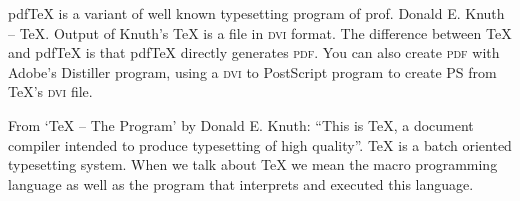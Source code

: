 \documentclass{article}
\begin{document}
\maketitle
\begin{abstract}\noindent\sffamily\itshape
    This document is a preliminary version of pdf\TeX's
    frequently asked questions (FAQ) and answers. If you can
    contribute to this document, please mail
    \href{mailto:cvr@river-valley.com}{C.~V.~Radhakrishnan}
    or \href{mailto:pdftex@tug.org}{pdf\TeX's mailing list}.
    Including the key \verb+FAQ+ in the
    subject line of your contribution will help the FAQ maintainer
    stay organized.  This document is in \LaTeX{} syntax and is
    generated in an Intel 500\textsc{mh}z \textsc{piii} system
    running Linux kernel version 2.2.12-20 by pdf\TeX{} ver.~14f.

\vspace*{.5in}
\copyright{This document is freely distributable.}

\end{abstract}


\setcounter{tocdepth}{3}
\tableofcontents

\clearpage




  pdf\TeX{} is a variant of well known typesetting program of prof.
  Donald E.  Knuth -- \TeX.  Output of Knuth's \TeX{} is a file in \textsc{dvi}
  format. The difference between \TeX{} and pdfTeX is that pdf\TeX{}
  directly generates \textsc{pdf}. You can also create \textsc{pdf} with Adobe's
  Distiller program, using a \textsc{dvi} to PostScript program to create PS
  from \TeX's \textsc{dvi} file.


 From `\TeX{} -- The
Program' by Donald E. Knuth: ``This is \TeX, a document compiler
intended to produce typesetting of high quality''. \TeX{} is a batch
oriented typesetting system. When we talk about \TeX{} we mean the
macro programming language as well as the program that interprets
and executed this language.

\end{document}
